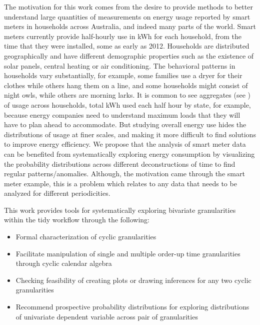 \documentclass[12pt]{article}
\begin{document}
The motivation for this work comes from the desire to provide methods to better understand large quantities of measurements on energy usage reported by smart meters in households across Australia, and indeed many parts of the world. Smart meters currently provide half-hourly use in kWh for each household, from the time that they were installed, some as early as 2012. Households are distributed geographically and have different demographic properties such as the existence of solar panels, central heating or air conditioning. The behavioral patterns in households vary substantially, for example, some families use a dryer for their clothes while others hang them on a line, and some households might consist of night owls, while others are morning larks. It is common to see aggregates (see \citet{2012-la}) of usage across households, total kWh used each half hour by state, for example, because energy companies need to understand maximum loads that they will have to plan ahead to accommodate. But studying overall energy use hides the distributions of usage at finer scales, and making it more difficult to find solutions to improve energy efficiency. We propose that the analysis of smart meter data can be benefited from systematically exploring energy consumption by visualizing the probability distributions across different deconstructions of time to find regular patterns/anomalies. Although, the motivation came through the smart meter example, this is a problem which relates to any data that needs to be analyzed for different periodicities.

This work provides tools for systematically exploring bivariate granularities within the tidy workflow through the following:

\begin{itemize}
\item
  Formal characterization of cyclic granularities
\item
  Facilitate manipulation of single and multiple order-up time granularities through cyclic calendar algebra
\item
  Checking feasibility of creating plots or drawing inferences for any two cyclic granularities
\item
  Recommend prospective probability distributions for exploring distributions of univariate dependent variable across pair of granularities
\end{itemize}
\end{document}
